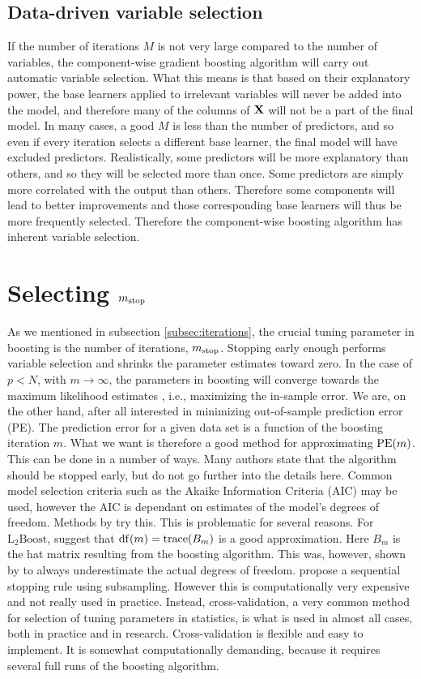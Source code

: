 \subsection{Data-driven variable selection}
If the number of iterations $M$ is not very large compared to the number of variables, the component-wise gradient boosting algorithm will carry out automatic variable selection. What this means is that based on their explanatory power, the base learners applied to irrelevant variables will never be added into the model, and therefore many of the columns of $\mathbf{X}$ will not be a part of the final model. In many cases, a good $M$ is less than the number of predictors, and so even if every iteration selects a different base learner, the final model will have excluded predictors. Realistically, some predictors will be more explanatory than others, and so they will be selected more than once. Some predictors are simply more correlated with the output than others. Therefore some components will lead to better improvements and those corresponding base learners will thus be more frequently selected. Therefore the component-wise boosting algorithm has inherent variable selection.

\section{Selecting $m_{\text{stop}}$}
As we mentioned in subsection \ref{subsec:iterations}, the crucial tuning parameter in boosting is the number of iterations, $m_{\text{stop}}$. Stopping early enough performs variable selection and shrinks the parameter estimates toward zero. In the case of $p<N$, with $m\to\infty$, the parameters in boosting will converge towards the maximum likelihood estimates \citep{DeBin2016}, i.e., maximizing the in-sample error. We are, on the other hand, after all interested in minimizing out-of-sample prediction error (PE). The prediction error for a given data set is a function of the boosting iteration $m$. What we want is therefore a good method for approximating $\operatorname{PE}(m)$. This can be done in a number of ways. Many authors state that the algorithm should be stopped early, but do not go further into the details here. Common model selection criteria such as the Akaike Information Criteria (AIC) may be used, however the AIC is dependant on estimates of the model's degrees of freedom. Methods by \citet{chang2010} try this. This is problematic for several reasons. For $\text{L}_2\text{Boost}$, \citet{buhlmann2007} suggest that $\operatorname{df}(m)=\operatorname{trace}(B_m)$ is a good approximation. Here $B_m$ is the hat matrix resulting from the boosting algorithm. This was, however, shown by \citet{hastie2007} to always underestimate the actual degrees of freedom. \citet{mayr-hofner} propose a sequential stopping rule using subsampling. However this is computationally very expensive and not really used in practice. Instead, cross-validation, a very common method for selection of tuning parameters in statistics, is what is used in almost all cases, both in practice and in research. Cross-validation is flexible and easy to implement. It is somewhat computationally demanding, because it requires several full runs of the boosting algorithm.

